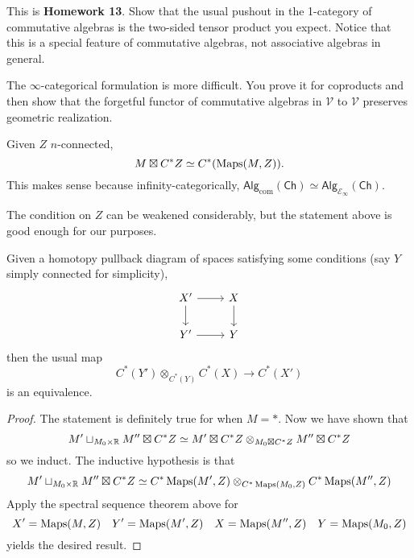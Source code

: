 \documentclass{amsart}
\begin{document}
\begin{exercise}
    This is \textbf{Homework 13}. Show that the usual pushout in the 1-category of commutative algebras
    is the two-sided tensor product you expect. Notice that this is a special feature
    of commutative algebras, not associative algebras in general.

    The $\infty$-categorical formulation is more difficult. You prove it for coproducts
    and then show that the forgetful functor of commutative algebras in $\mathcal{V}$ to $\mathcal{V}$
    preserves geometric realization.
\end{exercise}

\begin{theorem}
    Given $Z$ $n$-connected,
    \begin{equation*}
        M\boxtimes C^*Z \simeq C^*(\operatorname{Maps}(M,Z)).
    \end{equation*}
    This makes sense because infinity-categorically, $\mathsf{Alg}_\text{com}(\mathsf{Ch})\simeq\mathsf{Alg}_{\mathcal{E}_\infty}(\mathsf{Ch})$.
\end{theorem}

\begin{remark}
    The condition on $Z$ can be weakened considerably, but the statement above is good
    enough for our purposes.
\end{remark}

\begin{theorem}
    Given a homotopy pullback diagram of spaces satisfying some conditions (say $Y$ simply connected for simplicity),
    \begin{equation*}
        \begin{tikzcd}
            X' \rar\dar & X\dar \\
            Y' \rar & Y
        \end{tikzcd}
    \end{equation*}
    then the usual map
    \begin{equation*}
        C^*(Y')\otimes_{C^*(Y)}C^*(X)\to C^*(X')
    \end{equation*}
    is an equivalence.
\end{theorem}

\begin{proof}
    The statement is definitely true for when $M=*$. Now we have shown that
    \begin{equation*}
        M'\sqcup_{M_0\times\mathbb{R}}M'' \boxtimes C^*Z \simeq M'\boxtimes C^*Z\otimes_{M_0\boxtimes C^*Z}M''\boxtimes C^*Z
    \end{equation*}
    so we induct. The inductive hypothesis is that
    \begin{equation*}
        M'\sqcup_{M_0\times\mathbb{R}}M'' \boxtimes C^*Z \simeq C^*\operatorname{Maps}(M',Z)\otimes_{C^*\operatorname{Maps}(M_0,Z)}C^*\operatorname{Maps}(M'',Z)
    \end{equation*}
    Apply the spectral sequence theorem above for
    \begin{equation*}
        X'=\operatorname{Maps}(M,Z)\quad Y'=\operatorname{Maps}(M',Z)\quad X=\operatorname{Maps}(M'',Z)\quad Y=\operatorname{Maps}(M_0,Z)
    \end{equation*}
    yields the desired result.
\end{proof}
\end{document}
